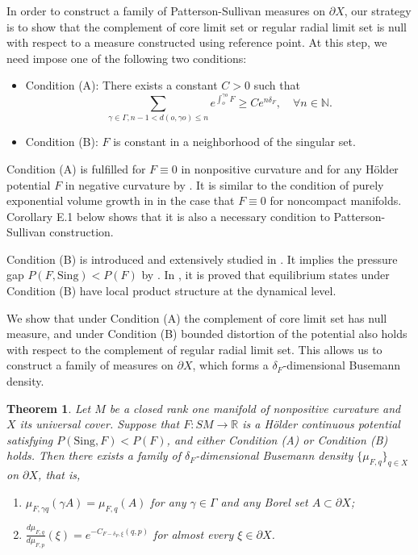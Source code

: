 \documentclass[11pt]{amsart}
\newtheorem{thmm}{Theorem}\renewcommand{\thethmm}{\Alph{thmm}}
\theoremstyle{definition}
\def\pX{{\partial X}}
\def\RR{{\mathbb R}}
\def\NN{{\mathbb N}}
\def\c{\gamma}   \def\C{\Gamma}
\def\d{\delta}   %
\begin{document}
In order to construct a family of Patterson-Sullivan measures on $\pX$, our strategy is to show that the complement of core limit set or regular radial limit set is null with respect to a measure constructed using reference point. At this step, we need impose one of the following two conditions:
\begin{itemize}
    \item Condition (A): There exists a constant $C>0$ such that 
    $$\sum_{\c\in \C, n-1< d(o, \c o)\le n}e^{\int_o^{\c o}F}\ge Ce^{n\d_F}, \quad \forall n\in \NN.$$ 
        \item Condition (B): $F$ is constant in a neighborhood of the singular set.
\end{itemize}

Condition (A) is fulfilled for $F\equiv 0$ in nonpositive curvature \cite[Theorem A]{Kn1} and for any H\"{o}lder potential $F$ in negative curvature by \cite[Corollary 9.10]{PPS}. It is similar to the condition of purely exponential volume growth in \cite{Zi} in the case that $F\equiv 0$ for noncompact manifolds. Corollary E.1 below shows that it is also a necessary condition to Patterson-Sullivan construction. 

Condition (B) is introduced and extensively studied in \cite{BCFT}. It implies the pressure gap  $P(F,\text{Sing})<P(F)$ by \cite[Theorem B]{BCFT}.  In \cite[Theorem D]{CCESW}, it is proved that equilibrium states under Condition (B) have local product structure at the dynamical level. 

We show that under Condition (A) the complement of core limit set has null measure, and under Condition (B) bounded distortion of the potential also holds with respect to the complement of regular radial limit set. This allows us to construct a family of measures on $\pX$, which forms a $\d_F$-dimensional Busemann density.
\begin{thmm}\label{ps}
Let $M$ be a closed rank one manifold of nonpositive curvature and $X$ its universal cover. Suppose that $F:SM\to \RR$ is a H\"{o}lder continuous potential satisfying $P(\text{Sing},F)<P(F)$, and either Condition (A) or Condition (B) holds. Then there exists a family of $\d_F$-dimensional Busemann density $\{\mu_{F,q}\}_{q\in X}$ on $\pX$, that is,
\begin{enumerate}
  \item $\mu_{F,\gamma q}(\gamma A)=\mu_{F,q}(A)$ for any $\c\in \Gamma$ and any Borel set $A\subset \pX$;
  \item $\frac{d\mu_{F,q}}{d\mu_{F,p}}(\xi)=e^{-C_{F-\d_F,\xi}(q,p)}$ for almost every $\xi\in \pX$.
\end{enumerate}    
\end{thmm}
\end{document}
